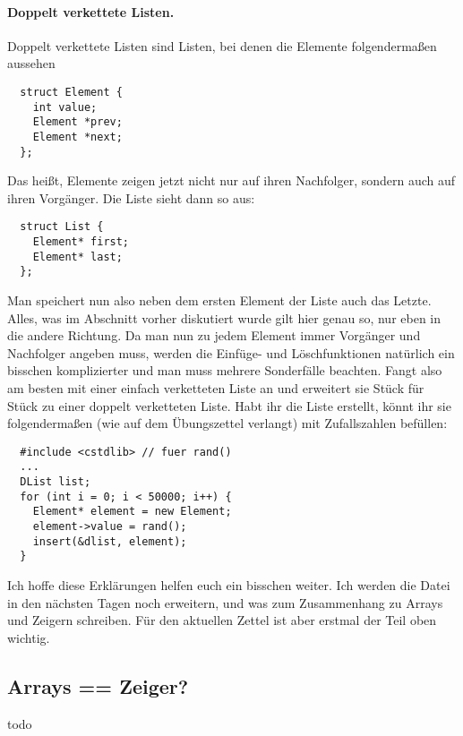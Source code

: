 \documentclass[
fontsize = 11pt,
paper    = a4,
BCOR     = 5mm,
DIV      = 12,
numbers  = noenddot,
]{scrartcl}
\begin{document}
\paragraph{Doppelt verkettete Listen.} Doppelt verkettete Listen sind
Listen, bei denen die Elemente folgendermaßen aussehen
\begin{lstlisting}
  struct Element {
    int value;
    Element *prev;
    Element *next;
  };
\end{lstlisting}
Das heißt, Elemente zeigen jetzt nicht nur auf ihren Nachfolger,
sondern auch auf ihren Vorgänger.  Die Liste sieht dann so aus:
\begin{lstlisting}
  struct List {
    Element* first;
    Element* last;
  };
\end{lstlisting}
Man speichert nun also neben dem ersten Element der Liste auch das
Letzte.  Alles, was im Abschnitt vorher diskutiert wurde gilt hier
genau so, nur eben in die andere Richtung. Da man nun zu jedem Element
immer Vorgänger und Nachfolger angeben muss, werden die Einfüge- und
Löschfunktionen natürlich ein bisschen komplizierter und man muss
mehrere Sonderfälle beachten. Fangt also am besten mit einer einfach
verketteten Liste an und erweitert sie Stück für Stück zu einer
doppelt verketteten Liste. Habt ihr die Liste erstellt, könnt ihr sie
folgendermaßen (wie auf dem Übungszettel verlangt) mit Zufallszahlen
befüllen:
\begin{lstlisting}
  #include <cstdlib> // fuer rand()
  ...
  DList list;
  for (int i = 0; i < 50000; i++) {
    Element* element = new Element;
    element->value = rand();
    insert(&dlist, element);
  }
\end{lstlisting}
Ich hoffe diese Erklärungen helfen euch ein bisschen weiter.  Ich
werden die Datei in den nächsten Tagen noch erweitern, und was zum
Zusammenhang zu Arrays und Zeigern schreiben. Für den aktuellen Zettel
ist aber erstmal der Teil oben wichtig.

\subsection*{Arrays == Zeiger?}
todo
\end{document}
